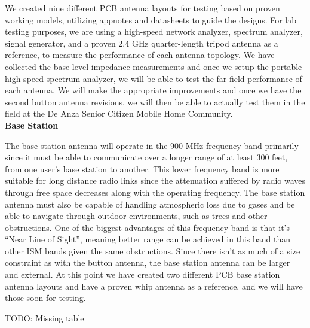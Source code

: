 \documentclass[journal,compsoc]{IEEEtran}
\begin{document}
\noindent We created nine different PCB antenna layouts for testing based on proven working models, utilizing appnotes and datasheets to guide the designs.  For lab testing purposes, we are using a high-speed network analyzer, spectrum analyzer, signal generator, and a proven 2.4 GHz quarter-length tripod antenna as a reference, to measure the performance of each antenna topology.  We have collected the base-level impedance measurements and once we setup the portable high-speed spectrum analyzer, we will be able to test the far-field performance of each antenna.  We will make the appropriate improvements and once we have the second button antenna revisions, we will then be able to actually test them in the field at the De Anza Senior Citizen Mobile Home Community.\\

\noindent \textbf {Base Station}

\noindent The base station antenna will operate in the 900 MHz frequency band primarily since it must be able to communicate over a longer range of at least 300 feet, from one user’s base station to another.  This lower frequency band is more suitable for long distance radio links since the attenuation suffered by radio waves through free space decreases along with the operating frequency.  The base station antenna must also be capable of handling atmospheric loss due to gases and be able to navigate through outdoor environments, such as trees and other obstructions.  One of the biggest advantages of this frequency band is that it’s “Near Line of Sight”, meaning better range can be achieved in this band than other ISM bands given the same obstructions.  Since there isn’t as much of a size constraint as with the button antenna, the base station antenna can be larger and external.  At this point we have created two different PCB base station antenna layouts and have a proven whip antenna as a reference, and we will have those soon for testing.

TODO: Missing table
\end{document}

